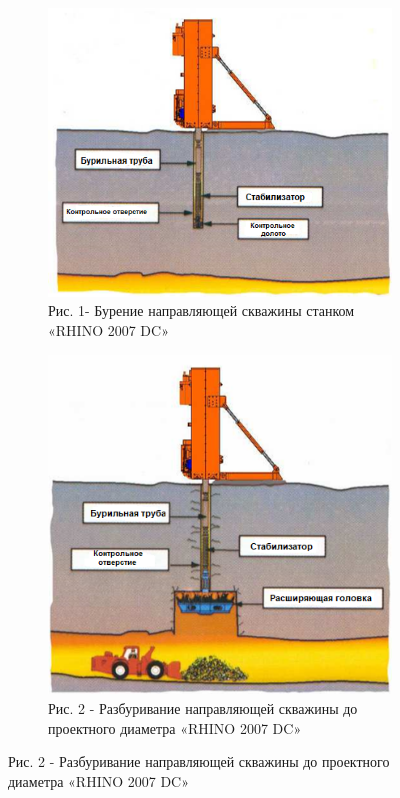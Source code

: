 \begin{figure}[H]
    \centering
    \begin{subfigure}[b]{0.45\textwidth}
        \centering
        \includegraphics[width=\textwidth]{assets/1121}
		\caption*{Рис. 1- Бурение направляющей скважины станком «RHINO 2007 DC»}
    \end{subfigure}
    \hfill
    \begin{subfigure}[b]{0.45\textwidth}
        \centering
        \includegraphics[width=\textwidth]{assets/1122}
		\caption*{Рис. 2 - Разбуривание направляющей скважины до проектного диаметра «RHINO 2007 DC»}
    \end{subfigure}
\end{figure}

